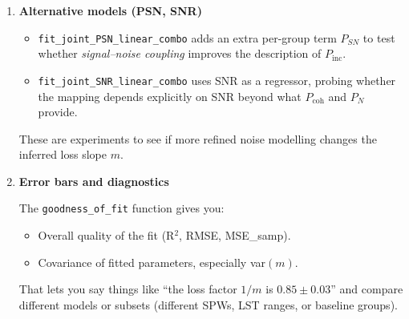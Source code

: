 \documentclass[11pt]{article}
\begin{document}
\begin{enumerate}[leftmargin=*]
\begin{itemize}[leftmargin=*]
  \item Per-group $N_a^{(g)}$ to absorb noise normalisation.
  \item Global $m$ capturing signal-loss.
\end{itemize}

This is a physically motivated decomposition:

\begin{itemize}[leftmargin=*]
  \item $P_N^{(g)}$ encodes variance of thermal noise for that group and time.
  \item $P_{\mathrm{coh}}^{(g)}$ is your ``true'' sky signal as measured by the coherent estimator.
  \item Any mismatch between $P_{\mathrm{inc}}$ and the naive sum $P_{\mathrm{coh}} + P_N$ is absorbed into $m$.
\end{itemize}

If the pipeline attenuates the coherent modes before they show up in the incoherent average, the fitted $m$ will depart from 1, giving a quantitative measure of signal loss.

  \item \textbf{Alternative models (PSN, SNR)}

\begin{itemize}[leftmargin=*]
  \item \texttt{fit\_joint\_PSN\_linear\_combo} adds an extra per-group term $P_{SN}$ to test whether \emph{signal--noise coupling} improves the description of $P_{\mathrm{inc}}$.
  \item \texttt{fit\_joint\_SNR\_linear\_combo} uses SNR as a regressor, probing whether the mapping depends explicitly on SNR beyond what $P_{\mathrm{coh}}$ and $P_N$ provide.
\end{itemize}

These are experiments to see if more refined noise modelling changes the inferred loss slope $m$.

  \item \textbf{Error bars and diagnostics}

The \texttt{goodness\_of\_fit} function gives you:

\begin{itemize}[leftmargin=*]
  \item Overall quality of the fit (R$^2$, RMSE, MSE\_samp).
  \item Covariance of fitted parameters, especially var$(m)$.
\end{itemize}

That lets you say things like ``the loss factor $1/m$ is $0.85 \pm 0.03$'' and compare different models or subsets (different SPWs, LST ranges, or baseline groups).
\end{enumerate}
\end{document}
